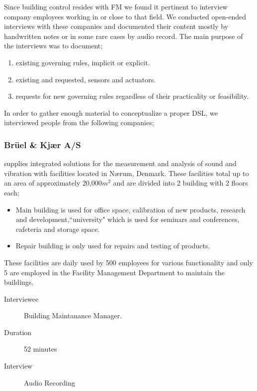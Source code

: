 Since building control resides with FM we found it pertinent to interview company employees working in or close to that field. We conducted open-ended interviews with these companies and documented their content mostly by handwritten notes or in some rare cases by audio record. The main purpose of the interviews was to document;

\begin{enumerate}
	\item existing governing rules, implicit or explicit.
	\item existing and requested, sensors and actuators.
	\item requests for new governing rules regardless of their practicality or feasibility.
\end{enumerate}

In order to gather enough material to conceptualize a proper DSL, we interviewed people from the following companies;

\subsubsection{Br\"{u}el \& Kj\ae r A/S} supplies integrated solutions for the measurement and analysis of sound and vibration with facilities located in N\ae rum, Denmark. These facilities total up to an area of approximately 20,000$m^2$ and are divided into 2 building with 2 floors each; 
\begin{itemize}
	\item Main building is used for office space, calibration of new products, research and development,``university" which is used for seminars and conferences, cafeteria and storage space.
	\item Repair building is only used for repairs and testing of products.
\end{itemize}	
These facilities are daily used by 500 employees for various functionality and only 5 are employed in the Facility Management Department to maintain the buildings.
\begin{description}
	\item[Interviewee] Building Maintanance Manager.
	\item[Duration] 52 minutes
	\item[Interview] Audio Recording
\end{description}

